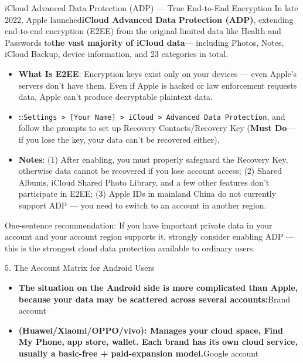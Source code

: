\begin{tcbwarn}{iCloud Advanced Data Protection (ADP) — True End-to-End Encryption}
In late 2022, Apple launched\textbf{iCloud Advanced Data Protection (ADP)}, extending end-to-end encryption (E2EE) from the original limited data like Health and Passwords to\textbf{the vast majority of iCloud data}— including Photos, Notes, iCloud Backup, device information, and 23 categories in total.

\begin{itemize}
  \item \textbf{What Is E2EE}: Encryption keys exist only on your devices — even Apple's servers don't have them. Even if Apple is hacked or law enforcement requests data, Apple can't produce decryptable plaintext data.
  \item \textbf{:}:\texttt{Settings > [Your Name] > iCloud > Advanced Data Protection}, and follow the prompts to set up Recovery Contacts/Recovery Key (\textbf{Must Do}— if you lose the key, your data can't be recovered either).
  \item \textbf{Notes}: (1) After enabling, you must properly safeguard the Recovery Key, otherwise data cannot be recovered if you lose account access; (2) Shared Albums, iCloud Shared Photo Library, and a few other features don't participate in E2EE; (3) Apple IDs in mainland China do not currently support ADP — you need to switch to an account in another region.
\end{itemize}

One-sentence recommendation: If you have important private data in your account and your account region supports it, strongly consider enabling ADP — this is the strongest cloud data protection available to ordinary users.

\end{tcbwarn}


5. The Account Matrix for Android Users

\begin{itemize}
  \item \textbf{The situation on the Android side is more complicated than Apple, because your data may be scattered across several accounts:}Brand account
  \item \textbf{(Huawei/Xiaomi/OPPO/vivo): Manages your cloud space, Find My Phone, app store, wallet. Each brand has its own cloud service, usually a basic-free + paid-expansion model.}Google account
\end{itemize}

